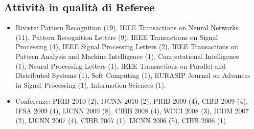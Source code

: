 \documentclass[a4paper,10pt]{article}
\begin{document}
\subsection*{Attivit\`a in qualit\`a di Referee}
\begin{itemize}
\item Riviste:
  Pattern Recognition (19),
  IEEE Transactions on Neural Networks (11), 
  Pattern Recognition Letters (9),
  IEEE Transactions on Signal Processing (4), 
  IEEE Signal Processing Letters (2), 
  IEEE Transactions on Pattern Analysis and Machine Intelligence (1), 
  Computational Intelligence (1),
  Neural Processing Letters (1),
  IEEE Transactions on Parallel and Distributed Systems (1),
  Soft Computing (1),
  EURASIP Journal on Advances in Signal Processing (1),
  Information Sciences (1).
\item Conferenze:
  PRIB 2010 (2), 
  IJCNN 2010 (2), 
  PRIB 2009 (4), 
  CIBB 2009 (4), 
  IFSA 2009 (4), 
  IJCNN 2009 (8), 
  CIBB 2008 (4), 
  WCCI 2008 (3), 
  ICDM 2007 (2), 
  IJCNN 2007 (4), 
  CIBB 2007 (1), 
  IJCNN 2006 (5), 
  CIBB 2006 (1).

\end{itemize}
\end{document}
